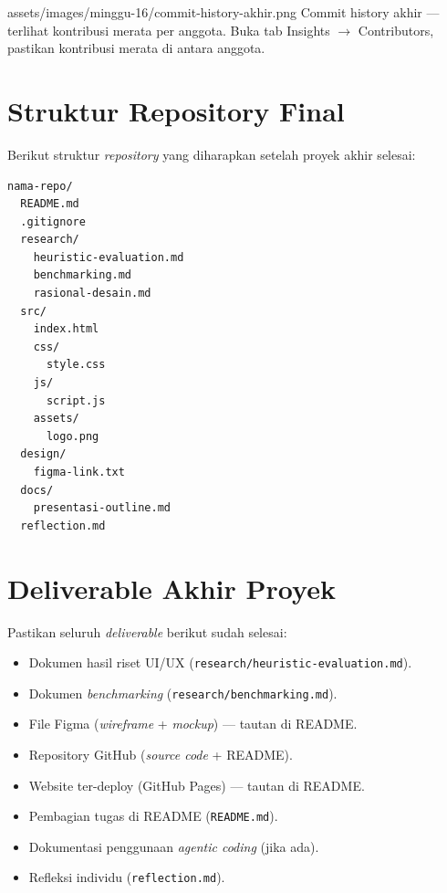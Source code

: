 \begin{tangkapanlayar}
  {assets/images/minggu-16/commit-history-akhir.png}
  {Commit history akhir --- terlihat kontribusi merata per anggota.}
  {Buka tab Insights $\rightarrow$ Contributors, pastikan kontribusi merata di antara anggota.}
\end{tangkapanlayar}

\section{Struktur Repository Final}
\label{sec:struktur-final}

Berikut struktur \emph{repository} yang diharapkan setelah proyek akhir selesai:

\begin{lstlisting}[caption={Struktur folder repository final}]
nama-repo/
  README.md
  .gitignore
  research/
    heuristic-evaluation.md
    benchmarking.md
    rasional-desain.md
  src/
    index.html
    css/
      style.css
    js/
      script.js
    assets/
      logo.png
  design/
    figma-link.txt
  docs/
    presentasi-outline.md
  reflection.md
\end{lstlisting}

\section{Deliverable Akhir Proyek}
\label{sec:deliverable}

Pastikan seluruh \emph{deliverable} berikut sudah selesai:
\begin{itemize}
  \item Dokumen hasil riset UI/UX (\texttt{research/heuristic-evaluation.md}).
  \item Dokumen \emph{benchmarking} (\texttt{research/benchmarking.md}).
  \item File Figma (\emph{wireframe} + \emph{mockup}) --- tautan di README.
  \item Repository GitHub (\emph{source code} + README).
  \item Website ter-deploy (GitHub Pages) --- tautan di README.
  \item Pembagian tugas di README (\texttt{README.md}).
  \item Dokumentasi penggunaan \emph{agentic coding} (jika ada).
  \item Refleksi individu (\texttt{reflection.md}).
\end{itemize}

